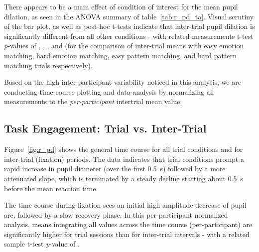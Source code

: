 	    There appears to be a main effect of condition of interest for the mean pupil dilation, as seen in the ANOVA summary of table~\ref{tab:r_pd_ta}.
	    Visual scrutiny of the bar plot, as well as post-hoc t-tests indicate that inter-trial pupil dilation is significantly different from all other conditions - 
	    with related measurements t-test \textit{p}-values of 
	    ,
	    ,
	    , and
	    (for the comparison of inter-trial means with easy emotion matching, hard emotion matching, easy pattern matching, and hard pattern matching trials respectively).
	    
	    Based on the high inter-participant variability noticed in this analysis, we are conducting time-course plotting and data analysis by normalizing all measurements to the \textit{per-participant} intertrial mean value.

	
	\subsection{Task Engagement: Trial vs. Inter-Trial}
	    Figure~\ref{fig:r_pd} shows the general time course for all trial conditions and for inter-trial (fixation) periods.
	    The data indicates that trial conditions prompt a rapid increase in pupil diameter (over the first \SI{0.5}{\second}) followed by a more attenuated slope, which is terminated by a steady decline starting about \SI{0.5}{\second} before the mean reaction time.
	    
	    The time course during fixation sees an initial high amplitude decrease of pupil are, followed by a slow recovery phase.
	    In this per-participant normalized analysis, means integrating all values across the time course (per-participant) are significantly higher for trial sessions than for inter-trial intervals - with a related sample t-test \textit{p}-value of 
	    .
